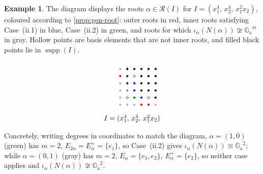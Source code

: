 \documentclass[11pt,letterpaper,reqno]{amsart}
\theoremstyle{remark}
\theoremstyle{definition}
\newtheorem{example}[example]{Example}
\newcommand{\GA}[0]{\ensuremath{\mathbb{G}_{\mathrm{a}}}}
\newcommand{\supp}[0]{\ensuremath{\operatorname{supp}}}
\begin{document}
\begin{example}\label{ex:gen-root-cases}
The diagram displays the roots $\alpha\in\mathcal R(I)$ for
$I=(x_1^4,\,x_2^4,\,x_1^2x_2)$, coloured according to \cref{prop:gen-root}: outer roots in red, inner roots satisfying
Case~(ii.1) in blue, Case~(ii.2) in green, and roots for which
$\iota_\alpha(N(\alpha))\not\cong\GA^m$ in gray. Hollow points are basis
elements that are not inner roots, and filled black points lie in $\supp(I)$.

$$
\begin{array}{c}
\begin{picture}(60,70)
\definecolor{gray1}{gray}{0.7}
\definecolor{gray2}{gray}{0.85}
\definecolor{green}{RGB}{0,124,0}

\textcolor{gray2}{\put(0,20){\vector(1,0){55}}}
\textcolor{gray2}{\put(10,10){\vector(0,1){55}}}

\put(0,10){\textcolor{gray1}{\circle*{3}}}
\put(10,10){\textcolor{gray1}{\circle*{3}}}
\put(20,10){\textcolor{gray1}{\circle*{3}}}
\put(30,10){\textcolor{red}{\circle*{3}}}
\put(40,10){\textcolor{red}{\circle*{3}}}
\put(50,10){\textcolor{gray1}{\circle*{3}}}

\put(0,20){\textcolor{gray1}{\circle*{3}}}
\put(10,20){\circle{3}}
\put(20,20){\textcolor{green}{\circle*{3}}}
\put(30,20){\textcolor{blue}{\circle*{3}}}
\put(40,20){\circle{3}}
\put(50,20){\circle*{3}}

\put(0,30){\textcolor{gray1}{\circle*{3}}}
\put(10,30){\textcolor{gray}{\circle*{3}}}
\put(20,30){\textcolor{blue}{\circle*{3}}}
\put(30,30){\circle*{3}}
\put(40,30){\circle*{3}}
\put(50,30){\circle*{3}}

\put(0,40){\textcolor{gray1}{\circle*{3}}}
\put(10,40){\textcolor{blue}{\circle*{3}}}
\put(20,40){\textcolor{blue}{\circle*{3}}}
\put(30,40){\circle*{3}}
\put(40,40){\circle*{3}}
\put(50,40){\circle*{3}}

\put(0,50){\textcolor{red}{\circle*{3}}}
\put(10,50){\textcolor{blue}{\circle*{3}}}
\put(20,50){\circle{3}}
\put(30,50){\circle*{3}}
\put(40,50){\circle*{3}}
\put(50,50){\circle*{3}}

\put(0,60){\textcolor{gray1}{\circle*{3}}}
\put(10,60){\circle*{3}}
\put(20,60){\circle*{3}}
\put(30,60){\circle*{3}}
\put(40,60){\circle*{3}}
\put(50,60){\circle*{3}}

\end{picture}\\
\multicolumn{1}{c}{I=(x_1^4,\,x_2^4,\,x_1^2x_2)}
\end{array}
$$

Concretely, writing degrees in coordinates to match the diagram,
$\alpha=(1,0)$ \textup{(green)} has $m=2$,
$E_{2\alpha}=E^+_\alpha=\{e_{1}\}$, so Case~(ii.2) gives
$\iota_\alpha(N(\alpha))\cong\GA^2$; while $\alpha=(0,1)$
\textup{(gray)} has $m=2$, $E_{\alpha}=\{e_{1},e_{2}\}$,
$E^+_\alpha=\{e_{2}\}$, so neither case applies and
$\iota_\alpha(N(\alpha))\not\cong\GA^2$.
\end{example}
\end{document}
